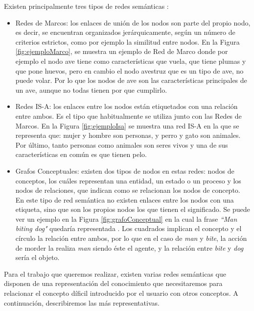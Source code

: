 Existen principalmente tres tipos de redes semánticas \citep{tiposRedesSemanticas}:
\begin{itemize}
	\item Redes de Marcos: los enlaces de unión de los nodos son parte del propio nodo, es decir, se encuentran organizados jerárquicamente, según un número de criterios estrictos, como por ejemplo la similitud entre nodos. En la Figura \ref{fig:ejemploMarco}, se muestra un ejemplo de Red de Marco donde por ejemplo el nodo ave tiene como características  que vuela, que tiene plumas y que pone huevos, pero en cambio el nodo avestruz que es un tipo de ave, no puede volar. Por lo que los nodos de ave son las características principales de un ave, aunque no todas tienen por que cumplirlo.
	\item Redes IS-A: los enlaces entre los nodos están etiquetados con una relación entre ambos. Es el tipo que habitualmente se utiliza junto con las Redes de Marcos. En la Figura \ref{fig:ejemploIsa} se muestra una red IS-A en la que se representa que: mujer y hombre son personas, y perro y gato son animales. Por último, tanto personas como animales son seres vivos y una de sus características en común es que tienen pelo.
	\item Grafos Conceptuales: existen dos tipos de nodos en estas redes: nodos de conceptos, los cuáles representan una entidad, un estado o un proceso y los nodos de relaciones, que indican como se relacionan los nodos de concepto. En este tipo de red semántica no existen enlaces entre los nodos con una etiqueta, sino que son los propios nodos los que tienen el significado. Se puede ver un ejemplo en la Figura \ref{fig:grafoConceptual} en la cual la frase \textit{``Man biting dog"} quedaría representada \citep{osti_5673179}. Los cuadrados implican el concepto y el círculo la relación entre ambos, por lo que en el caso de \textit{man} y \textit{bite}, la acción de morder la realiza \textit{man} siendo éste el agente, y la relación entre \textit{bite} y \textit{dog} sería el objeto.
\end{itemize}

Para el trabajo que queremos realizar, existen varias redes semánticas que disponen de una representación del conocimiento que necesitaremos para relacionar el concepto díficil introducido por el usuario con otros conceptos. A continuación, describiremos las más representativas.

